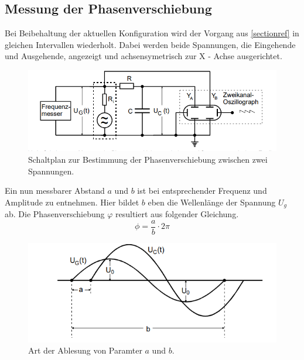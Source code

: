 \subsection{Messung der Phasenverschiebung}
Bei Beibehaltung der aktuellen Konfiguration wird der Vorgang aus \ref{sectionref} in gleichen Intervallen
wiederholt. Dabei werden beide Spannungen, die Eingehende und Ausgehende, angezeigt und achsensymetrisch
zur X - Achse ausgerichtet.\\
\begin{figure}
    \centering 
    \includegraphics[width=\textwidth]{bilder/ab.png}
    \caption{Schaltplan zur Bestimmung der Phasenverschiebung zwischen zwei Spannungen.\cite{skript}}
    \label{fig:ab}
\end{figure} 
Ein nun messbarer Abstand $a$ und $b$ %
ist bei entsprechender Frequenz und Amplitude zu entnehmen. Hier bildet $b$ eben die Wellenlänge
der Spannung $U_g$ ab. Die Phasenverschiebung $\varphi$ resultiert aus folgender Gleichung.
\begin{equation}
    \label{eqn:phi}
    \phi= \frac{a}{b} \cdot 2 \pi
\end{equation}

\begin{figure}
    \centering
    \includegraphics[width=\textwidth]{bilder/ab2.png}
    \caption{Art der Ablesung von Paramter $a$ und $b$.\cite{skript}}
    \label{fig:ab}
\end{figure}
